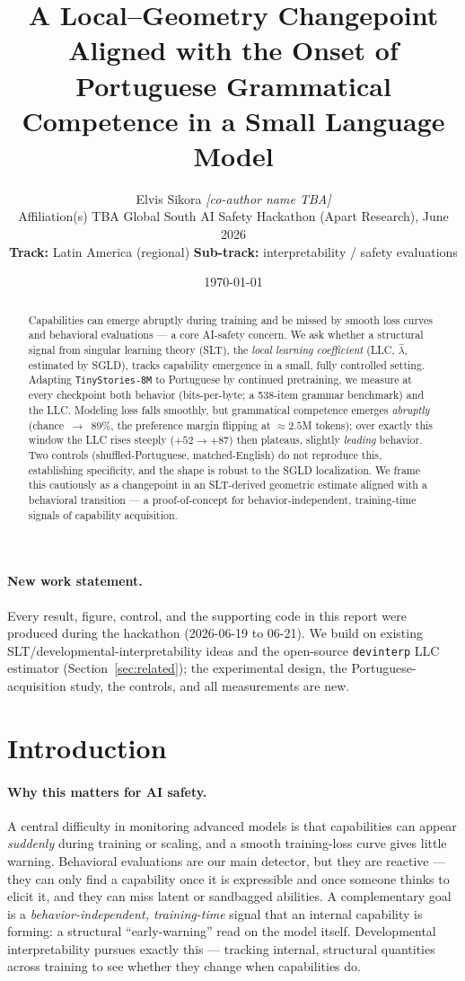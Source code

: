\documentclass[11pt]{article}
\title{\textbf{A Local--Geometry Changepoint Aligned with the Onset of\\
Portuguese Grammatical Competence in a Small Language Model}}
\author{Elvis Sikora \quad\textit{[co-author name TBA]}\\[2pt]
\small Affiliation(s) TBA \quad\textbar\quad Global South AI Safety Hackathon (Apart Research), June 2026\\
\small \textbf{Track:} Latin America (regional) \quad\textbar\quad \textbf{Sub-track:} interpretability / safety evaluations}
\date{\today}
\newcommand{\lhat}{\hat{\lambda}}
\begin{document}
\maketitle

\begin{abstract}
\noindent
Capabilities can emerge abruptly during training and be missed by smooth loss
curves and behavioral evaluations --- a core AI-safety concern. We ask whether a
structural signal from singular learning theory (SLT), the \emph{local learning
coefficient} (LLC, $\lhat$, estimated by SGLD), tracks capability emergence in a
small, fully controlled setting. Adapting \texttt{TinyStories-8M} to Portuguese
by continued pretraining, we measure at every checkpoint both behavior
(bits-per-byte; a 538-item grammar benchmark) and the LLC. Modeling loss falls
smoothly, but grammatical competence emerges \emph{abruptly}
(chance~$\rightarrow$~$89\%$, the preference margin flipping at $\approx\!2.5$M
tokens); over exactly this window the LLC rises steeply ($+52\rightarrow+87$)
then plateaus, slightly \emph{leading} behavior. Two controls
(shuffled-Portuguese, matched-English) do not reproduce this, establishing
specificity, and the shape is robust to the SGLD localization. We frame this
cautiously as a changepoint in an SLT-derived geometric estimate aligned with a
behavioral transition --- a proof-of-concept for behavior-independent,
training-time signals of capability acquisition.
\end{abstract}

\paragraph{New work statement.} Every result, figure, control, and the supporting
code in this report were produced during the hackathon (2026-06-19 to 06-21). We
build on existing SLT/developmental-interpretability ideas and the open-source
\texttt{devinterp} LLC estimator (Section~\ref{sec:related}); the experimental
design, the Portuguese-acquisition study, the controls, and all measurements are
new.

\section{Introduction}
\paragraph{Why this matters for AI safety.} A central difficulty in monitoring
advanced models is that capabilities can appear \emph{suddenly} during training
or scaling, and a smooth training-loss curve gives little warning. Behavioral
evaluations are our main detector, but they are reactive --- they can only find a
capability once it is expressible and once someone thinks to elicit it, and they
can miss latent or sandbagged abilities. A complementary goal is a
\emph{behavior-independent, training-time} signal that an internal capability is
forming: a structural ``early-warning'' read on the model itself. Developmental
interpretability pursues exactly this --- tracking internal, structural quantities
across training to see whether they change when capabilities do.
\end{document}
